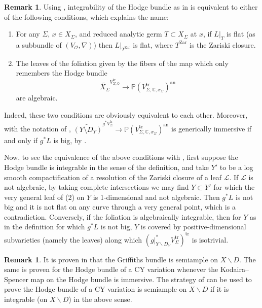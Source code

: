 \documentclass{amsart}
\newcommand{\bs}{\backslash}
\newcommand{\an}{\operatorname{an}}
\theoremstyle{definition}
\newtheorem{rem}[theorem]{Remark}
\theoremstyle{remark}
\def\bQ{\mathbb{Q}}
\def\bC{\mathbb{C}}
\def\bP{\mathbb{P}}
\def\cL{\mathcal{L}}
\def\cO{\mathcal{O}}
\def\an{\mathrm{an}}
\def\trans{\mathrm{tr}}
\numberwithin{equation}{section}
\begin{document}
\begin{rem}\label{rmk:torsion Hodge}Using , integrability of the Hodge bundle as in  is equivalent to either of the following conditions, which explains the name:  
\begin{enumerate}
\item For any $\Sigma$, $x\in X_\Sigma$, and reduced analytic germ $T\subset X_\Sigma$ at $x$, if $L|_T$ is flat (as a subbundle of $(V_\cO,\nabla)$) then $L|_{T^\mathrm{Zar}}$ is flat, where $T^\mathrm{Zar}$ is the Zariski closure.
\item The leaves of the foliation given by the fibers of the map which only remembers the Hodge bundle
\[\widetilde{X_\Sigma}^{V_{\Sigma,\bQ}^\trans}\to \bP(V^\trans_{\Sigma,\bC,x_\Sigma})^\an\]
are algebraic.
\end{enumerate}
Indeed, these two conditions are obviously equivalent to each other.  Moreover, with the notation of , $\widetilde{(Y\setminus D_Y)}^{g^*V^\trans_\Sigma}\to\bP(V^\trans_{\Sigma,\bC,x_\Sigma})^\an$ is generically immersive if and only if $g^*L$ is big, by \cite[Lemma 6.17]{BBT23}.  

Now, to see the equivalence of the above conditions with , first suppose the Hodge bundle is integrable in the sense of the definition, and take $Y'$ to be a log smooth compactification of a resolution of the Zariski closure of a leaf $\cL$.  If $\cL$ is not algebraic, by taking complete intersections we may find $Y\subset Y'$ for which the very general leaf of (2) on $Y$ is 1-dimensional and not algebraic.  Then $g^*L$ is not big and it is not flat on any curve through a very general point, which is a contradiction.  Conversely, if the foliation is algebraically integrable, then for $Y$ as in the definition for which $g^*L$ is not big, $Y$ is covered by positive-dimensional subvarieties (namely the leaves) along which $(g|_{Y\backslash D_Y}^*V_\Sigma^\trans)^\trans$ is isotrivial.
\end{rem}

\begin{rem}  It is proven in \cite{BBT23} that the Griffiths bundle is semiample on $X\bs D$.  The same is proven for the Hodge bundle of a CY variation whenever the Kodaira--Spencer map on the Hodge bundle is immersive. The strategy of  can be used to prove the Hodge bundle of a CY variation is semiample on $X\bs D$ if it is integrable (on $X\bs D$) in the above sense.   
\end{rem}
\end{document}
